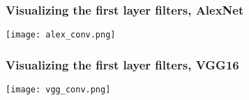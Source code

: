 \documentclass[../presentation.tex]{subfiles} %
\begin{document}
\begin{frame}
    \frametitle{Visualizing the first layer filters, AlexNet}
    \begin{center}
        \texttt{[image: alex\_conv.png]}
    \end{center}
\end{frame}

\begin{frame}
    \frametitle{Visualizing the first layer filters, VGG16}
    \begin{center}
        \texttt{[image: vgg\_conv.png]}
    \end{center}
\end{frame}
\end{document}
